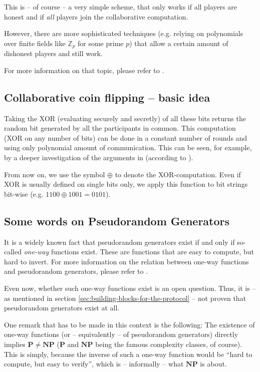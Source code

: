 This is -- of course -- a very simple scheme, that only works if all players are honest and if \emph{all} players join the collaborative computation.

However, there are more sophisticated techniques (e.g. relying on polynomials over finite fields like $\mathbb Z_p$ for some prime $p$) that allow a certain amount of dishonest players and still work. 

For more information on that topic, please refer to \cite{shamir_secret_sharing}.

\subsection{Collaborative coin flipping -- basic idea}
\label{sec:appendix-coin-flipping}

Taking the XOR (evaluating securely and secretly) of all these bits returns the random bit generated by all the participants in common. This computation (XOR on any number of bits) can be done in a constant number of rounds and using only polynomial amount of communication. This can be seen, for example, by a deeper investigation of the arguments in \cite{beaver-verifiable-secret-sharing} (according to \cite{Beaver1990}).

From now on, we use the symbol $\oplus$ to denote the XOR-computation. Even if XOR is usually defined on single bits only, we apply this function to bit strings bit-wise (e.g. $1100\oplus1001=0101$).

\subsection{Some words on Pseudorandom Generators}
\label{sec:appendix-pseudorandom-generators}

It is a widely known fact that pseudorandom generators exist if and only if so-called \emph{one-way} functions exist. These are functions that are easy to compute, but hard to invert. For more information on the relation between one-way functions and pseudorandom generators, please refer to \cite{lecture-notes-goldwasser-bellare,yao-theory-application-trapdoor-functions,pseudorandom-generators-blum}.

Even now, whether such one-way functions exist is an open question. Thus, it is -- as mentioned in section \ref{sec:building-blocks-for-the-protocol} -- not proven that pseudorandom generators exist at all.

One remark that has to be made in this context is the following: The existence of one-way functions (or -- equivalently -- of pseudorandom generators) directly implies $\mathbf{P}\neq\mathbf{NP}$ ($\mathbf{P}$ and $\mathbf{NP}$ being the famous complexity classes, of course). This is simply, because the inverse of such a one-way function would be ``hard to compute, but easy to verify'', which is -- informally -- what $\mathbf{NP}$ is about.

